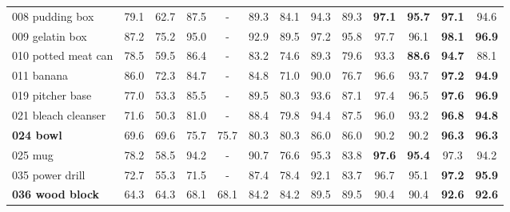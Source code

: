 \begin{table*}[tp]
\begin{tabular}{l|C{\ycbC cm}|C{\ycbC cm}|C{\ycbC cm}|C{\ycbC cm}|C{\ycbC cm}|C{\ycbC cm}|C{\ycbC cm}|C{\ycbC cm}|C{\ycbC cm}|C{\ycbC cm}|C{\ycbC cm}|C{\ycbC cm}}
        008 pudding box                & 79.1        & 62.7          & 87.5          & -               & 89.3      & 84.1        & 94.3           & 89.3             & \textbf{97.1} & \textbf{95.7} & \textbf{97.1} & 94.6          \\
        009 gelatin box                & 87.2        & 75.2          & 95.0          & -               & 92.9      & 89.5        & 97.2           & 95.8             & 97.7          & 96.1          & \textbf{98.1} & \textbf{96.9} \\
        010 potted meat can            & 78.5        & 59.5          & 86.4          & -               & 83.2      & 74.6        & 89.3           & 79.6             & 93.3          & \textbf{88.6} & \textbf{94.7} & 88.1          \\
        011 banana                     & 86.0        & 72.3          & 84.7          & -               & 84.8      & 71.0        & 90.0           & 76.7             & 96.6          & 93.7          & \textbf{97.2} & \textbf{94.9} \\
        019 pitcher base               & 77.0        & 53.3          & 85.5          & -               & 89.5      & 80.3        & 93.6           & 87.1             & 97.4          & 96.5          & \textbf{97.6} & \textbf{96.9} \\
        021 bleach cleanser            & 71.6        & 50.3          & 81.0          & -               & 88.4      & 79.8        & 94.4           & 87.5             & 96.0          & 93.2          & \textbf{96.8} & \textbf{94.8} \\
        \textbf{024 bowl}              & 69.6        & 69.6          & 75.7          & 75.7            & 80.3      & 80.3        & 86.0           & 86.0             & 90.2          & 90.2          & \textbf{96.3} & \textbf{96.3} \\
        025 mug                        & 78.2        & 58.5          & 94.2          & -               & 90.7      & 76.6        & 95.3           & 83.8             & \textbf{97.6} & \textbf{95.4} & 97.3          & 94.2          \\
        035 power drill                & 72.7        & 55.3          & 71.5          & -               & 87.4      & 78.4        & 92.1           & 83.7             & 96.7          & 95.1          & \textbf{97.2} & \textbf{95.9} \\
        \textbf{036 wood block}        & 64.3        & 64.3          & 68.1          & 68.1            & 84.2      & 84.2        & 89.5           & 89.5             & 90.4          & 90.4          & \textbf{92.6} & \textbf{92.6} \\

\end{tabular}
\end{table*}
